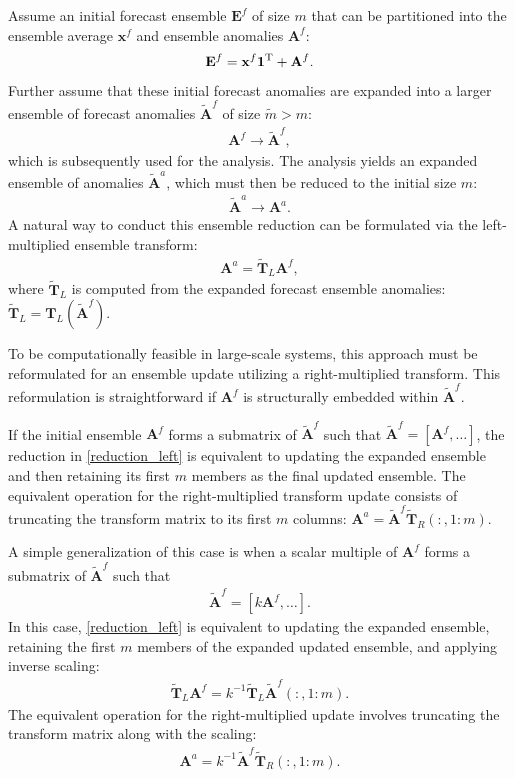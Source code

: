 \documentclass[11pt]{report}
\newcommand{\mb} {\mathbf}
\newcommand{\T}{^{\tiny \mathrm T}}
\begin{document}
Assume an initial forecast ensemble $\mb E^f$ of size $m$ that can be partitioned into the ensemble average $\mb x^f$ and ensemble anomalies $\mb A^f$:
\begin{align*}
  \mb E^f = \mb x^f \mb 1\T + \mb A^f.
\end{align*}
Further assume that these initial forecast anomalies are expanded into a larger ensemble of forecast anomalies $\tilde{\mb A}^f$ of size $\tilde{m} > m$:
\begin{align*}
  \mb A^f \to \tilde{\mb A}^f,
\end{align*}
which is subsequently used for the analysis.
The analysis yields an expanded ensemble of anomalies $\tilde{\mb A}^a$, which must then be reduced to the initial size $m$:
\begin{align*}
  \tilde{\mb A}^a \to \mb A^a.
\end{align*}
A natural way to conduct this ensemble reduction can be formulated via the left-multiplied ensemble transform:
\begin{align}
  \label{reduction_left}
  \mb A^a = \tilde{\mb T}_L \mb A^f,
\end{align}
where $\tilde{\mb T}_L$ is computed from the expanded forecast ensemble anomalies: $\tilde{\mb T}_L = \mb T_L(\tilde{\mb A}^f)$.

To be computationally feasible in large-scale systems, this approach must be reformulated for an ensemble update utilizing a right-multiplied transform.
This reformulation is straightforward if $\mb A^f$ is structurally embedded within $\tilde{\mb A}^f$.

If the initial ensemble $\mb A^f$ forms a submatrix of $\tilde{\mb A}^f$ such that $\tilde{\mb A}^f = [\mb A^f, \dots]$, the reduction in \eqref{reduction_left} is equivalent to updating the expanded ensemble and then retaining its first $m$ members as the final updated ensemble.
The equivalent operation for the right-multiplied transform update consists of truncating the transform matrix to its first $m$ columns: $\mb A^a = \tilde{\mb A}^f \tilde{\mb T}_R(:, 1:m)$.

A simple generalization of this case is when a scalar multiple of $\mb A^f$ forms a submatrix of $\tilde{\mb A}^f$ such that
\begin{align}
  \tilde{\mb A}^f = [k \mb A^f, \dots].
\end{align}
In this case, \eqref{reduction_left} is equivalent to updating the expanded ensemble, retaining the first $m$ members of the expanded updated ensemble, and applying inverse scaling:
\begin{align*}
  \tilde{\mb T}_L \mb A^f = k^{-1} \tilde{\mb T}_L \tilde{\mb A}^f(:, 1 : m).
\end{align*}
The equivalent operation for the right-multiplied update involves truncating the transform matrix along with the scaling:
\begin{align}
  \label{reduction_right}
  \mb A^a = k^{-1} \tilde{\mb A}^f \tilde{\mb T}_R(:, 1:m).
\end{align}
\end{document}
